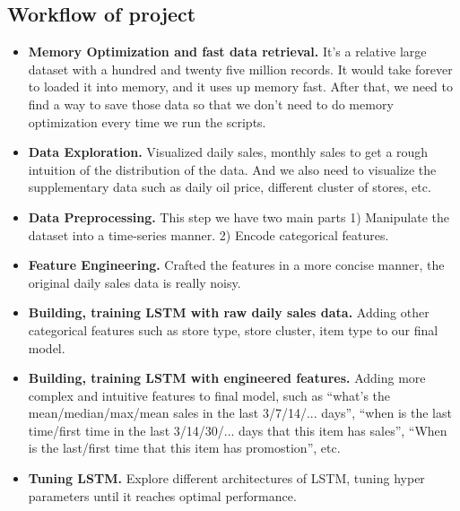 \documentclass{article}
\begin{document}
\subsection{Workflow of project}

\begin{itemize}

    \item \textbf{Memory Optimization and fast data retrieval.} It's a relative large dataset with a hundred and twenty five million records. It would take forever to loaded it into memory, and it uses up memory fast. After that, we need to find a way to save those data so that we don't need to do memory optimization every time we run the scripts. 

    \item \textbf{Data Exploration.} Visualized daily sales, monthly sales to get a rough intuition of the distribution of the data. And we also need to visualize the supplementary data such as daily oil price, different cluster of stores, etc.

    \item \textbf{Data Preprocessing.} This step we have two main parts 1) Manipulate the dataset into a time-series manner. 2) Encode categorical features. 

    \item \textbf{Feature Engineering.} Crafted the features in a more concise manner, the original daily sales data is really noisy. 

    \item \textbf{Building, training LSTM with raw daily sales data.} Adding other categorical features such as store type, store cluster, item type to our final model. 

    \item \textbf{Building, training LSTM with engineered features.} Adding more complex and intuitive features to final model, such as ``what's the mean/median/max/mean sales in the last 3/7/14/... days'', ``when is the last time/first time in the last 3/14/30/... days that this item has sales'', ``When is the last/first time that this item has promostion'', etc.

    \item \textbf{Tuning LSTM.} Explore different architectures of LSTM, tuning hyper parameters until it reaches optimal performance. 

\end{itemize}





\end{document}
